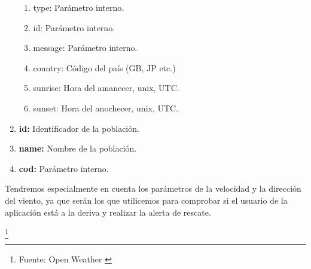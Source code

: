 \begin{enumerate}
\begin{enumerate}
\item type: Parámetro interno.
\item id: Parámetro interno.
\item message: Parámetro interno.
\item country: Código del país (GB, JP etc.)
\item sunrise: Hora del amanecer, unix, UTC.
\item sunset: Hora del anochecer, unix, UTC.
\end{enumerate}
\item  \textbf{id:} Identificador de la población.
\item  \textbf{name:} Nombre de la población.
\item  \textbf{cod:} Parámetro interno.
\end{enumerate}

Tendremos especialmente en cuenta los parámetros de la velocidad y la dirección del viento, ya que serán los que utilicemos para comprobar si el usuario de la aplicación está a la deriva y realizar la alerta de rescate.

\footnote{Fuente: Open Weather \cite{OPENWEATHER}}
